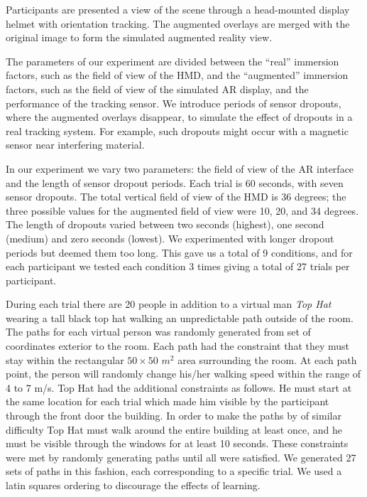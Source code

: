 \documentclass{acmsiggraph}                     %
\begin{document}
Participants are presented a view of the scene through a head-mounted display helmet with orientation tracking.  The augmented overlays are merged with the original image to form the simulated augmented reality view.

The parameters of our experiment are divided between the ``real'' immersion factors, such as the field of view of the HMD, and the ``augmented'' immersion factors, such as the field of view of the simulated AR display, and the performance of the tracking sensor.  We introduce periods of sensor dropouts, where the augmented overlays disappear, to simulate the effect of dropouts in a real tracking system.  For example, such dropouts might occur with a magnetic sensor near interfering material.

In our experiment we vary two parameters: the field of view of the AR interface and the length of sensor dropout periods.  Each trial is 60 seconds, with seven sensor dropouts.  The total vertical field of view of the HMD is 36 degrees; the three possible values for the augmented field of view were 10, 20, and 34 degrees.  The length of dropouts varied between two seconds (highest), one second (medium) and zero seconds (lowest).  We experimented with longer dropout periods but deemed them too long.  This gave us a total of 9 conditions, and for each participant we tested each condition 3 times giving a total of 27 trials per participant.

During each trial there are 20 people in addition to a virtual man \emph{Top Hat} wearing a tall black top hat walking an unpredictable path outside of the room.  The paths for each virtual person was randomly generated from set of coordinates exterior to the room.  Each path had the constraint that they must stay within the rectangular $50\times50$ $m^2$ area surrounding the room.  At each path point, the person will randomly change his/her walking speed within the range of 4 to 7 m/s.  Top Hat had the additional constraints as follows.  He must start at the same location for each trial which made him visible by the participant through the front door the building.  In order to make the paths by of similar difficulty Top Hat must walk around the entire building at least once, and he must be visible through the windows for at least 10 seconds.  These constraints were met by randomly generating paths until all were satisfied.  We generated 27 sets of paths in this fashion, each corresponding to a specific trial.  We used a latin squares ordering to discourage the effects of learning.
\end{document}
